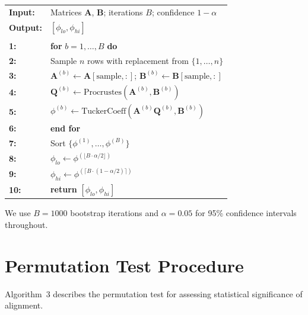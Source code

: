 \documentclass[11pt,twocolumn]{article}
\begin{document}
\begin{tcolorbox}[colback=gray!5,colframe=farzullaburgundy,title={\textbf{Algorithm 2:} Bootstrap CI for $\phi$}]
\begin{tabular}{@{}ll@{}}
\textbf{Input:} & Matrices $\mathbf{A}$, $\mathbf{B}$; iterations $B$; confidence $1-\alpha$ \\
\textbf{Output:} & $[\phi_{lo}, \phi_{hi}]$ \\
\\
\textbf{1:} & \textbf{for} $b = 1, \ldots, B$ \textbf{do} \\
\textbf{2:} & \quad Sample $n$ rows with replacement from $\{1, \ldots, n\}$ \\
\textbf{3:} & \quad $\mathbf{A}^{(b)} \gets \mathbf{A}[\text{sample}, :]$; $\mathbf{B}^{(b)} \gets \mathbf{B}[\text{sample}, :]$ \\
\textbf{4:} & \quad $\mathbf{Q}^{(b)} \gets \text{Procrustes}(\mathbf{A}^{(b)}, \mathbf{B}^{(b)})$ \\
\textbf{5:} & \quad $\phi^{(b)} \gets \text{TuckerCoeff}(\mathbf{A}^{(b)}\mathbf{Q}^{(b)}, \mathbf{B}^{(b)})$ \\
\textbf{6:} & \textbf{end for} \\
\textbf{7:} & Sort $\{\phi^{(1)}, \ldots, \phi^{(B)}\}$ \\
\textbf{8:} & $\phi_{lo} \gets \phi^{(\lfloor B \cdot \alpha/2 \rfloor)}$ \\
\textbf{9:} & $\phi_{hi} \gets \phi^{(\lceil B \cdot (1-\alpha/2) \rceil)}$ \\
\textbf{10:} & \textbf{return} $[\phi_{lo}, \phi_{hi}]$
\end{tabular}
\end{tcolorbox}

We use $B = 1000$ bootstrap iterations and $\alpha = 0.05$ for 95\% confidence intervals throughout.

\section{Permutation Test Procedure}
\label{app:permutation}

Algorithm~3 describes the permutation test for assessing statistical significance of alignment.
\end{document}
